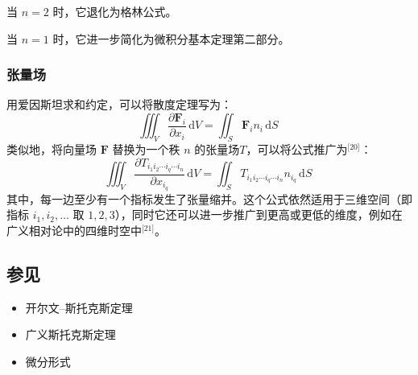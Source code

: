 当 $n = 2$ 时，它退化为格林公式。

当 $n = 1$ 时，它进一步简化为微积分基本定理第二部分。
\subsubsection{张量场}
用爱因斯坦求和约定，可以将散度定理写为：
$$
\iiint_V 
\frac{\partial \mathbf{F}_i}{\partial x_i} 
\,\mathrm{d}V
=
\iint_S 
\mathbf{F}_i n_i 
\,\mathrm{d}S~
$$
类似地，将向量场 $\mathbf{F}$ 替换为一个秩 $n$ 的张量场$T$，可以将公式推广为\(^\text{[20]}\)：
$$
\iiint_V 
\frac{\partial T_{i_1 i_2 \cdots i_q \cdots i_n}}{\partial x_{i_q}} 
\,\mathrm{d}V
=
\iint_S 
T_{i_1 i_2 \cdots i_q \cdots i_n} 
n_{i_q} 
\,\mathrm{d}S~
$$
其中，每一边至少有一个指标发生了张量缩并。这个公式依然适用于三维空间（即指标 $i_1, i_2, \dots$ 取 $1, 2, 3$），同时它还可以进一步推广到更高或更低的维度，例如在广义相对论中的四维时空中\(^\text{[21]}\)。
\subsection{参见}
\begin{itemize}
\item 开尔文–斯托克斯定理
\item 广义斯托克斯定理
\item 微分形式
\end{itemize}
